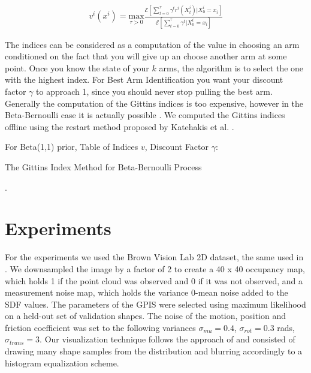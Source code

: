 \documentclass[journal,transmag]{IEEEtran}%
\begin{document}
\vspace{-2ex}
\label{eq:git_indices}
\begin{align}
	v^i(x^i) = \underset{\tau>0}{\mbox{max}} \frac{\mathcal{E}[\sum_{t=0}^{\tau}\gamma^tr^i(X_t^i)|X_0^i = x_i]}{\mathcal{E}[\sum_{t=0}^{\tau}\gamma^t|X_0^i = x_i]}
\end{align}


The indices can be considered as a computation of the value in choosing an arm conditioned on the fact that you will give up an choose another arm at some point. Once you know the state of your $k$ arms, the algorithm is to select the one with the highest index.  For Best Arm Identification you want your discount factor $\gamma$ to approach 1, since you should never stop pulling the best arm. Generally the computation of the Gittins indices is too expensive, however in the Beta-Bernoulli case it is actually possible \cite{kaufmann2012bayesian}. We computed the Gittins indices offline using the restart method proposed by Katehakis et al. \cite{katehakis1987multi}.


\begin{algorithm}
 For Beta(1,1) prior, Table of Indices $v$, Discount Factor $\gamma$: \\
 \caption{The Gittins Index Method for Beta-Bernoulli Process}
\end{algorithm}

 .
\section{Experiments}
For the experiments we used the Brown Vision Lab 2D dataset, the same used in \cite{christopoulos2007handling}. We downsampled the image by a factor of 2 to create a 40 x 40 occupancy map, which holds 1 if the point cloud was observed and 0 if it was not observed, and a measurement noise map, which holds the variance 0-mean noise added to the SDF values. The parameters of the GPIS were selected using maximum likelihood on a held-out set of validation shapes. The noise of the motion, position and friction coefficient was set to the following variances $\sigma_{mu} = 0.4$, $\sigma_{rot} = 0.3$ rads,$\sigma_{trans} = 3$. Our visualization technique follows the approach of \cite{mahler2015gp} and consisted of drawing many shape samples from the distribution and blurring accordingly to a histogram equalization scheme. 
\end{document}
